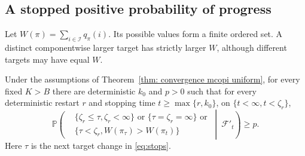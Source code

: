 \subsection{A stopped positive probability of progress}
Let $W(\pi)=\sum_{i\in\mathcal I}q_\pi(i)$. Its possible values form a finite ordered set. A distinct componentwise larger target has strictly larger $W$, although different targets may have equal
$W$.

\begin{lemma}\label{thm: fixed prob that bad actions dont become greedy}
Under the assumptions of Theorem~\ref{thm: convergence mcopi uniform}, for
every fixed $K>B$ there are deterministic $k_0$ and $p>0$ such that for every deterministic
restart $r$ and stopping time $t\ge\max\{r,k_0\}$, on $\{t<\infty,t<\zeta_r\}$,
\begin{equation}\label{eq:progress}
\mathbb P\!\left(
\begin{aligned}
&\{\zeta_r\le\tau,\zeta_r<\infty\}\text{ or }\{\tau=\zeta_r=\infty\}\text{ or}\\
&\{\tau<\zeta_r,W(\pi_\tau)>W(\pi_t)\}
\end{aligned}
\ \middle|\ \mathcal F'_t\right)\ge p.
\end{equation}
Here $\tau$ is the next target change in \eqref{eq:stops}.
\end{lemma}
